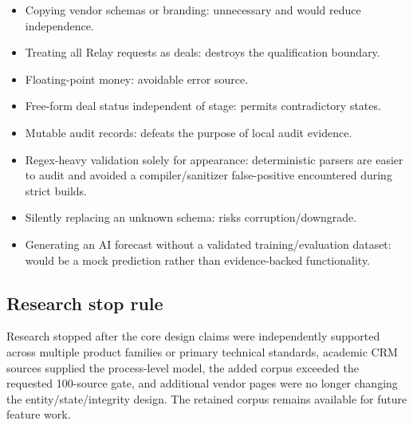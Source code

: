 \documentclass[
]{article}
\providecommand{\tightlist}{%
  \setlength{\itemsep}{0pt}\setlength{\parskip}{0pt}}
\begin{document}
\begin{itemize}
\tightlist
\item
  Copying vendor schemas or branding: unnecessary and would reduce
  independence.
\item
  Treating all Relay requests as deals: destroys the qualification
  boundary.
\item
  Floating-point money: avoidable error source.
\item
  Free-form deal status independent of stage: permits contradictory
  states.
\item
  Mutable audit records: defeats the purpose of local audit evidence.
\item
  Regex-heavy validation solely for appearance: deterministic parsers
  are easier to audit and avoided a compiler/sanitizer false-positive
  encountered during strict builds.
\item
  Silently replacing an unknown schema: risks corruption/downgrade.
\item
  Generating an AI forecast without a validated training/evaluation
  dataset: would be a mock prediction rather than evidence-backed
  functionality.
\end{itemize}

\subsection{Research stop rule}\label{research-stop-rule}

Research stopped after the core design claims were independently
supported across multiple product families or primary technical
standards, academic CRM sources supplied the process-level model, the
added corpus exceeded the requested 100-source gate, and additional
vendor pages were no longer changing the entity/state/integrity design.
The retained corpus remains available for future feature work.
\end{document}

